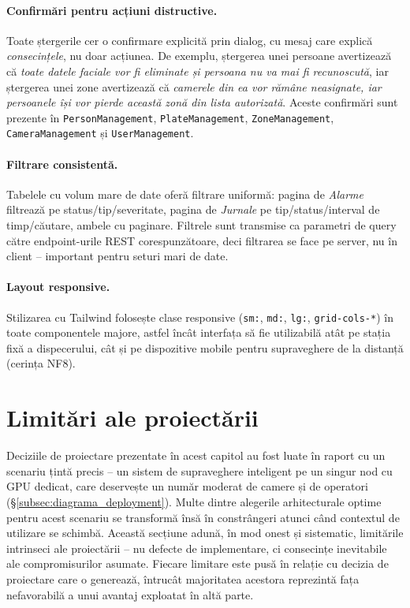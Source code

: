 \documentclass[../../main.tex]{subfiles}
\begin{document}
\paragraph*{Confirmări pentru acțiuni distructive.} Toate ștergerile cer o confirmare explicită prin dialog, cu mesaj care explică \emph{consecințele}, nu doar acțiunea. De exemplu, ștergerea unei persoane avertizează că \emph{toate datele faciale vor fi eliminate și persoana nu va mai fi recunoscută}, iar ștergerea unei zone avertizează că \emph{camerele din ea vor rămâne neasignate, iar persoanele își vor pierde această zonă din lista autorizată}. Aceste confirmări sunt prezente în \texttt{PersonManagement}, \texttt{PlateManagement}, \texttt{ZoneManagement}, \texttt{CameraManagement} și \texttt{UserManagement}.

\paragraph*{Filtrare consistentă.} Tabelele cu volum mare de date oferă filtrare uniformă: pagina de \emph{Alarme} filtrează pe status/tip/severitate, pagina de \emph{Jurnale} pe tip/status/\linebreak interval de timp/căutare, ambele cu paginare. Filtrele sunt transmise ca parametri de query către endpoint-urile REST corespunzătoare, deci filtrarea se face pe server, nu în client -- important pentru seturi mari de date.

\paragraph*{Layout responsive.} Stilizarea cu Tailwind folosește clase responsive (\texttt{sm:}, \texttt{md:}, \texttt{lg:}, \texttt{grid-cols-*}) în toate componentele majore, astfel încât interfața să fie utilizabilă atât pe stația fixă a dispecerului, cât și pe dispozitive mobile pentru supraveghere de la distanță (cerința NF8).

\section{Limitări ale proiectării}
\label{sec:limitari_proiectare}

Deciziile de proiectare prezentate în acest capitol au fost luate în raport cu un scenariu țintă precis -- un sistem de supraveghere inteligent pe un singur nod cu GPU dedicat, care deservește un număr moderat de camere și de operatori (\S\ref{subsec:diagrama_deployment}). Multe dintre alegerile arhitecturale optime pentru acest scenariu se transformă însă în constrângeri atunci când contextul de utilizare se schimbă. Această secțiune adună, în mod onest și sistematic, limitările intrinseci ale proiectării -- nu defecte de implementare, ci consecințe inevitabile ale compromisurilor asumate. Fiecare limitare este pusă în relație cu decizia de proiectare care o generează, întrucât majoritatea acestora reprezintă fața nefavorabilă a unui avantaj exploatat în altă parte.
\end{document}
